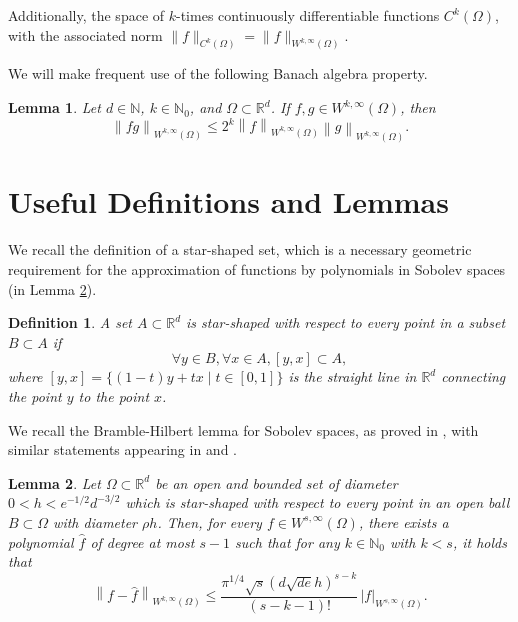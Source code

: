 \documentclass{article}
\newcommand{\fr}{\frac}
\newtheorem{defi}{Definition}
\newcommand{\WnormD}[4]{\left\lVert #1 \right\rVert_{W^{#2, #3} ({#4})}}
\newtheorem{lem}{Lemma}
\numberwithin{Def}{section}
\newcommand{\N}{\mathbb N}
\newcommand{\R}{\mathbb R}
\begin{document}
Additionally, the space of $k$-times continuously differentiable functions $C^k (\Omega)$, with the associated norm $\lVert f \rVert_{C^k (\Omega)} = \lVert f \rVert_{W^{k, \infty} (\Omega)}$.

We will make frequent use of the following Banach algebra property.
\begin{lem}
\label{banachAlgebraProperty}
Let $d \in \N$, $k \in \N_0$, and $\Omega \subset \R^d$. If $f,g \in W^{k, \infty} (\Omega)$, then
\begin{equation}
    \WnormD{fg}{k}{\infty}{\Omega} \leq 2^k \WnormD{f}{k}{\infty}{\Omega} \WnormD{g}{k}{\infty}{\Omega}.
\end{equation}
\end{lem}

\section{Useful Definitions and Lemmas}
We recall the definition of a star-shaped set, which is a necessary geometric requirement for the approximation of functions by polynomials in Sobolev spaces (in Lemma \ref{BrambleHilbert}). 
\begin{defi}
\label{starShapedSet}
    A set $A \subset \R^d$ is star-shaped with respect to every point in a subset $B \subset A$ if
    \begin{equation}
        \forall y \in B, \forall x \in A, [y,x] \subset A,
    \end{equation}
    where $[y,x] = \{(1-t) y + tx \mid t \in [0,1] \}$ is the straight line in $\R^d$ connecting the point $y$ to the point $x$. 
\end{defi}
We recall the Bramble-Hilbert lemma for Sobolev spaces, as proved in \cite{de2021approximation}, with similar statements appearing in \cite{duran1983polynomial} and \cite{verfurth1999note}.
\begin{lem}
\label{BrambleHilbert}
    Let $\Omega \subset \R^d$ be an open and bounded set of diameter $0 < h < e^{-1/2} d^{-3/2}$ which is star-shaped with respect to every point in an open ball $B \subset \Omega$ with diameter $\rho h$. Then, for every $f \in W^{s, \infty} (\Omega)$, there exists a polynomial $\hat f$ of degree at most $s-1$ such that for any $k \in \N_0$ with $k < s$, it holds that
    \begin{equation}
        \WnormD{f - \hat f}{k}{\infty}{\Omega} \leq \fr{\pi^{1/4} \sqrt{s} (d \sqrt{de}h)^{s-k}}{(s-k-1)!} \, |f|_{W^{s, \infty}(\Omega)}.
    \end{equation}
\end{lem}
\end{document}
